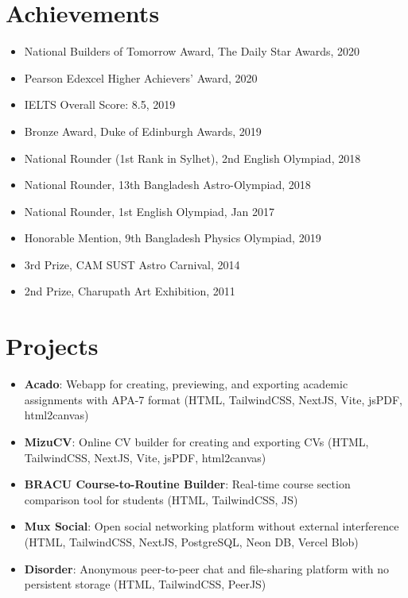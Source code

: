 \documentclass[10pt,letterpaper]{article}
\begin{document}
\section*{Achievements}
\begin{itemize}
    \item National Builders of Tomorrow Award, The Daily Star Awards, 2020
    \item Pearson Edexcel Higher Achievers' Award, 2020
    \item IELTS Overall Score: 8.5, 2019
    \item Bronze Award, Duke of Edinburgh Awards, 2019
    \item National Rounder (1st Rank in Sylhet), 2nd English Olympiad, 2018
    \item National Rounder, 13th Bangladesh Astro-Olympiad, 2018
    \item National Rounder, 1st English Olympiad, Jan 2017
    \item Honorable Mention, 9th Bangladesh Physics Olympiad, 2019
    \item 3rd Prize, CAM SUST Astro Carnival, 2014
    \item 2nd Prize, Charupath Art Exhibition, 2011
\end{itemize}

\section*{Projects}
\begin{itemize}
    \item \textbf{Acado}: Webapp for creating, previewing, and exporting academic assignments with APA-7 format (HTML, TailwindCSS, NextJS, Vite, jsPDF, html2canvas)
    \item \textbf{MizuCV}: Online CV builder for creating and exporting CVs (HTML, TailwindCSS, NextJS, Vite, jsPDF, html2canvas)
    \item \textbf{BRACU Course-to-Routine Builder}: Real-time course section comparison tool for students (HTML, TailwindCSS, JS)
    \item \textbf{Mux Social}: Open social networking platform without external interference (HTML, TailwindCSS, NextJS, PostgreSQL, Neon DB, Vercel Blob)
    \item \textbf{Disorder}: Anonymous peer-to-peer chat and file-sharing platform with no persistent storage (HTML, TailwindCSS, PeerJS)
\end{itemize}
\end{document}
